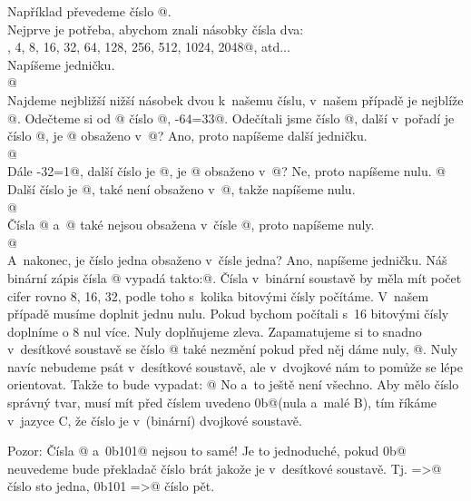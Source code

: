   Například převedeme číslo @. \\ 
\noindent Nejprve je potřeba, abychom znali násobky čísla dva: \\ 
, 4, 8, 16, 32, 64, 128, 256, 512, 1024, 2048@, atd... \\
Napíšeme jedničku. \\
@ \\ 
Najdeme nejbližší nižší násobek dvou k~našemu číslu, v~našem případě je nejblíže @.  
Odečteme si od @ číslo @, -64=33@. Odečítali jsme číslo @, 
další v~pořadí je číslo @, je @ obsaženo v~@? Ano, proto napíšeme další jedničku. \\ 
@ \\ 
Dále -32=1@, další číslo je @, je @ obsaženo v~@? Ne, proto napíšeme nulu.
@ \\ 
Další číslo je @, také není obsaženo v~@, takže napíšeme nulu. \\ 
@ \\ 
Čísla @ a~@ také nejsou obsažena v~čísle @, proto napíšeme nuly. \\
@ \\
A~nakonec, je číslo jedna obsaženo v~čísle jedna? Ano, napíšeme jedničku.
Náš binární zápis čísla @ vypadá takto:@. 
Čísla v~binární soustavě by měla mít počet cifer rovno 8, 16, 32, 
podle toho s~kolika bitovými čísly počítáme. V~našem případě musíme doplnit jednu nulu. 
Pokud bychom počítali s~16 bitovými čísly doplníme o 8 nul více. Nuly doplňujeme zleva.
 Zapamatujeme si to snadno v~desítkové soustavě se číslo @ také nezmění pokud před něj dáme nuly,
  @. Nuly navíc nebudeme psát v~desítkové soustavě, ale v~dvojkové nám to pomůže se lépe orientovat. 
  Takže to bude vypadat: @ 
No a~to ještě není všechno. Aby mělo číslo správný tvar, musí mít před číslem uvedeno \verb@0b@(nula a~malé B),
 tím říkáme v~jazyce C, že číslo je v~(binární) dvojkové soustavě. 

Pozor: Čísla @ a~\verb@0b101@ nejsou to samé! Je to jednoduché, 
pokud \verb@0b@ neuvedeme bude překladač číslo brát jakože je v~desítkové soustavě. Tj.  =>@ číslo sto jedna, \verb@0b101 =>@ číslo pět.

